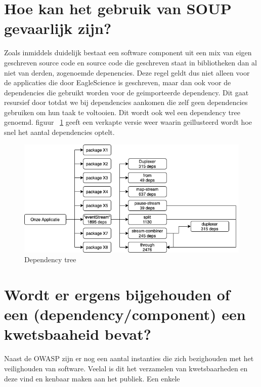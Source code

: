 
\section{Hoe kan het gebruik van SOUP gevaarlijk zijn?}\label{sec:hoe-kan-het-gebruik-van-soup-gevaarlijk-zijn?}
Zoals inmiddels duidelijk bestaat een software component uit een mix van eigen geschreven source code en source code die geschreven staat in bibliotheken dan al niet van derden, zogenoemde depenencies. Deze regel geldt dus niet alleen voor de applicaties die door EagleScience is geschreven, maar dan ook voor de dependencies die gebruikt worden voor de geimporteerde dependency. Dit gaat resursief door totdat we bij dependencies aankomen die zelf geen dependencies gebruiken om hun taak te voltooien. Dit wordt ook wel een dependency tree genoemd. figuur ~\ref{fig:dependency-tree} geeft een verkapte versie weer waarin geillusteerd wordt hoe snel het aantal dependencies optelt.
\begin{figure}[H]
    \myfloatalign
    \includegraphics[width=12cm]{gfx/dependency-tree}
    \caption{Dependency tree}\label{fig:dependency-tree}
\end{figure}




\section{Wordt er ergens bijgehouden of een (dependency/component) een kwetsbaaheid bevat?}\label{sec:item-wordt-er-ergens-bijgehouden-of-een-dependency/component)-een-kwetsbaaheid-bevat?}
Naast de OWASP zijn er nog een aantal instanties die zich bezighouden met het veilighouden van software. Veelal is dit het verzamelen van kwetsbaarheden en deze vind en kenbaar maken aan het publiek. Een enkele

